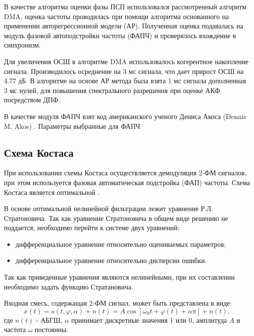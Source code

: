 В качестве алгоритма оценки фазы ПСП использовался
рассмотренный алгоритм DMA, оценка частоты проводилась при помощи алгоритма основанного на применении авторегрессионной модели (АР).
Полученная оценка подавалась на модуль фазовой автоподстройки частоты (ФАПЧ) и проверялось вхождение в синхронизм.

Для увеличения ОСШ в алгоритме DMA использовалось когерентное накопление сигнала. Производилось осреднение на 3 мс сигнала, что дает прирост ОСШ на 4.77 дБ.
В алгоритме на основе АР метода была взята 1 мс сигнала дополненная 3 мс нулей, для повышения спектрального разрешения при оценке АКФ посредством ДПФ.

В качестве модуля ФАПЧ взят код американского ученого Дениса Акоса (Dennis M. Akos) \cite{sandiaproject}.
Параметры выбранные для ФАПЧ
\subsection{Схема Костаса}

При использовании схемы Костаса осуществляется демодуляция 2-ФМ сигналов, при этом используется фазовая автоматическая подстройка (ФАП) частоты. Схема
Костаса является оптимальной \cite{shahtarin-wiener-kalman}.

В основе оптимальной нелинейной фильтрации лежит уравнение Р.Л. Стратоновича. Так как уравнение Стратоновича в общем виде решению не поддается, необходимо
перейти к системе двух уравнений:
\begin{itemize}
	\item дифференциальное уравнение относительно оцениваемых параметров;
	\item дифференциальное уравнение относительно дисперсии ошибки.
\end{itemize}

Так как приведенные уравнения являются нелинейными, при их составлении необходимо задать функцию Стратановича.

Входная смесь, содержащая 2-ФМ сигнал, может быть представлена в виде:
\begin{equation}
	x(t) = s(t, \varphi, \alpha) + n(t) = A \cos \left[ \omega_0t + \varphi(t) +\alpha \pi \right] + n(t),
	\label{eq:sec4_sig}
\end{equation}
где ${n(t)}$ - АБГШ, ${\alpha}$ принимает дискретные значения 1 или 0, амплитуда ${A}$ и частота ${\omega}$ постоянны.

